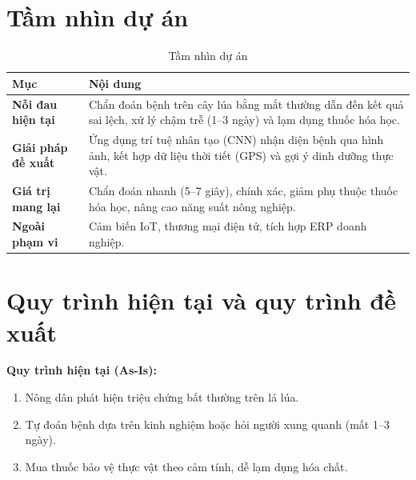 \documentclass[12pt,a4paper]{article}
\begin{document}
\clearpage
\tableofcontents
\clearpage
\listoffigures
\clearpage
\listoftables
\clearpage

\section{Tầm nhìn dự án}

\begin{longtable}{|l|p{11.5cm}|}
    \caption{Tầm nhìn dự án}                                                                                                                                 \\
    \hline
    \rowcolor{headerblue}
    \textbf{Mục}               & \textbf{Nội dung}                                                                                                           \\
    \hline
    \textbf{Nỗi đau hiện tại}  & Chẩn đoán bệnh trên cây lúa bằng mắt thường dẫn đến kết quả sai lệch, xử lý chậm trễ (1--3 ngày) và lạm dụng thuốc hóa học. \\
    \hline
    \textbf{Giải pháp đề xuất} & Ứng dụng trí tuệ nhân tạo (CNN) nhận diện bệnh qua hình ảnh, kết hợp dữ liệu thời tiết (GPS) và gợi ý dinh dưỡng thực vật.  \\
    \hline
    \textbf{Giá trị mang lại}  & Chẩn đoán nhanh (5--7 giây), chính xác, giảm phụ thuộc thuốc hóa học, nâng cao năng suất nông nghiệp.                       \\
    \hline
    \textbf{Ngoài phạm vi}     & Cảm biến IoT, thương mại điện tử, tích hợp ERP doanh nghiệp.                                                                \\
    \hline
\end{longtable}

\section{Quy trình hiện tại và quy trình đề xuất}

\textbf{Quy trình hiện tại (As-Is):}
\begin{enumerate}
    \item Nông dân phát hiện triệu chứng bất thường trên lá lúa.
    \item Tự đoán bệnh dựa trên kinh nghiệm hoặc hỏi người xung quanh (mất 1--3 ngày).
    \item Mua thuốc bảo vệ thực vật theo cảm tính, dễ lạm dụng hóa chất.
\end{enumerate}
\end{document}
